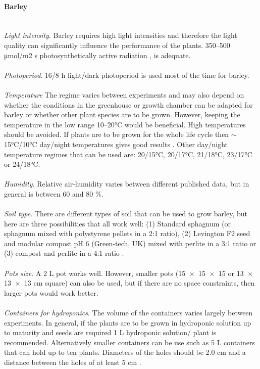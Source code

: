 \paragraph{Barley}\mbox{}  \\
\textit{Light intensity}. Barley requires high light intensities and therefore the light quality can significantly influence the performance of the plants. 350–500 μmol/m2 s photosynthetically active radiation \parencite{Gries1995}, \parencite{Holme2006} is adequate.\\ \\
\textit{Photoperiod}. 16/8 h light/dark photoperiod is used most of the time for barley. \\ \\
\textit{Temperature} The regime varies between experiments and may also depend on whether the conditions in the greenhouse or growth chamber can be adapted for barley or whether other plant species are to be grown. However, keeping the temperature in the low range 10–20°C would be beneficial. High temperatures should be avoided. If plants are to be grown for the whole life cycle then $\sim$15°C/10°C day/night temperatures gives good results \parencite{Holme2006}. Other day/night temperature regimes that can be used are: 20/15°C, 20/17°C, 21/18°C, 23/17°C \parencite{Gries1995} or 24/18°C. \\ \\
\textit{Humidity}. Relative air-humidity varies between different published data, but in general is between 60 and 80 \%. \\ \\
\textit{Soil type}. There are different types of soil that can be used to grow barley, but here are three possibilities that all work well: (1) Standard sphagnum (or sphagnum mixed with polystyrene pellets in a 2:1 ratio), (2) Levington F2 seed and modular compost pH 6 (Green-tech, UK) mixed with perlite in a 3:1 ratio or (3) compost and perlite in a 4:1 ratio \parencite{Murray2004}. \\ \\
\textit{Pots size}. A 2 L pot works well. However, smaller pots (15  ×  15  ×  15 or 13  ×  13  ×  13 cm square) can also be used, but if there are no space constraints, then larger pots would work better. \\ \\
\textit{Containers for hydroponics}. The volume of the containers varies largely between experiments. In general, if the plants are to be grown in hydroponic solution up to maturity and seeds are required 1 L hydroponic solution/ plant is recommended. Alternatively smaller containers can be use such as 5 L containers that can hold up to ten plants. Diameters of the holes should be 2.0 cm and a distance between the holes of at least 5 cm \parencite{Podar2012}.

